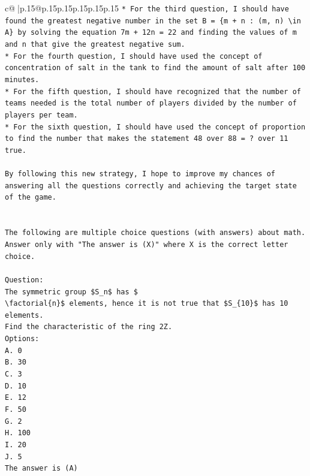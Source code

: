 \documentclass{article}
\begin{document}
{\begin{supertabular}{c@{$\;$}|p{.15\linewidth}@{}p{.15\linewidth}p{.15\linewidth}p{.15\linewidth}p{.15\linewidth}p{.15\linewidth}}
{{{\texttt{* For the third question, I should have found the greatest negative number in the set B = \{m + n : (m, n) \textbackslash{}in A\} by solving the equation 7m + 12n = 22 and finding the values of m and n that give the greatest negative sum.} \\
\texttt{* For the fourth question, I should have used the concept of concentration of salt in the tank to find the amount of salt after 100 minutes.} \\
\texttt{* For the fifth question, I should have recognized that the number of teams needed is the total number of players divided by the number of players per team.} \\
\texttt{* For the sixth question, I should have used the concept of proportion to find the number that makes the statement 48 over 88 = ? over 11 true.} \\
\\ 
\texttt{By following this new strategy, I hope to improve my chances of answering all the questions correctly and achieving the target state of the game.} \\
\\ 
\\ 
\texttt{The following are multiple choice questions (with answers) about math. Answer only with "The answer is (X)" where X is the correct letter choice.} \\
\\ 
\texttt{Question:} \\
\texttt{The symmetric group \$S\_n\$ has \$} \\
\texttt{\textbackslash{}factorial\{n\}\$ elements, hence it is not true that \$S\_\{10\}\$ has 10 elements.} \\
\texttt{Find the characteristic of the ring 2Z.} \\
\texttt{Options:} \\
\texttt{A. 0} \\
\texttt{B. 30} \\
\texttt{C. 3} \\
\texttt{D. 10} \\
\texttt{E. 12} \\
\texttt{F. 50} \\
\texttt{G. 2} \\
\texttt{H. 100} \\
\texttt{I. 20} \\
\texttt{J. 5} \\
\texttt{The answer is (A)} \\
\\ 
}}}
\end{supertabular}}
\end{document}
